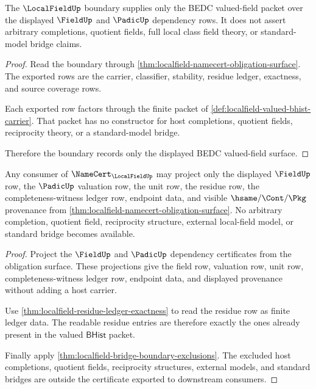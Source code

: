 \begin{theorem}
\label{thm:localfield-bridge-boundary-exclusions}
The $\LocalFieldUp$ boundary supplies only the BEDC valued-field packet over
the displayed $\FieldUp$ and $\PadicUp$ dependency rows. It does not assert
arbitrary completions, quotient fields, full local class field theory, or
standard-model bridge claims.
\end{theorem}
\begin{proof}
Read the boundary through
\autoref{thm:localfield-namecert-obligation-surface}. The exported rows are
the carrier, classifier, stability, residue ledger, exactness, and source
coverage rows.

Each exported row factors through the finite packet of
\autoref{def:localfield-valued-bhist-carrier}. That packet has no constructor
for host completions, quotient fields, reciprocity theory, or a standard-model
bridge.

Therefore the boundary records only the displayed BEDC valued-field surface.
\end{proof}

\begin{theorem}
\label{thm:localfield-valued-field-consumer-threshold}
Any consumer of $\NameCert_{\LocalFieldUp}$ may project only the displayed
$\FieldUp$ row, the $\PadicUp$ valuation row, the unit row, the residue row,
the completeness-witness ledger row, endpoint data, and visible
$\hsame/\Cont/\Pkg$ provenance from
\autoref{thm:localfield-namecert-obligation-surface}. No arbitrary
completion, quotient field, reciprocity structure, external local-field
model, or standard bridge becomes available.
\end{theorem}
\begin{proof}
Project the $\FieldUp$ and $\PadicUp$ dependency certificates from the
obligation surface. These projections give the field row, valuation row, unit
row, completeness-witness ledger row, endpoint data, and displayed provenance
without adding a host carrier.

Use \autoref{thm:localfield-residue-ledger-exactness} to read the residue row
as finite ledger data. The readable residue entries are therefore exactly the
ones already present in the valued $\mathsf{BHist}$ packet.

Finally apply \autoref{thm:localfield-bridge-boundary-exclusions}. The excluded
host completions, quotient fields, reciprocity structures, external models,
and standard bridges are outside the certificate exported to downstream
consumers.
\end{proof}

